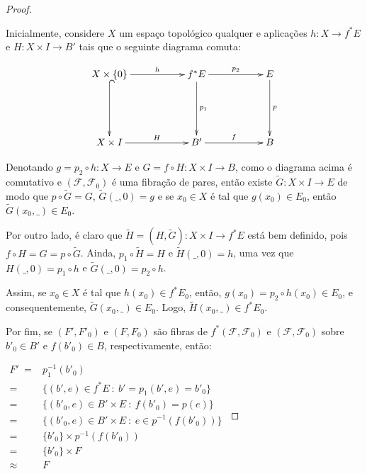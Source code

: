 \documentclass[12pt,oneside]{book} %
\newcommand{\wt}{\widetilde}
\begin{document}
\begin{proof}
	
	\
	
	\par Inicialmente, considere $X$ um espaço topológico qualquer e aplicações $h:X\to f^{*}E$ e $H:X\times I\to B'$ tais que o seguinte diagrama comuta:
	
	$$\xymatrix @C=0.5cm {
		X\times\{ 0 \} \ar[rrr]^-{h} \ar@{^(->}[dd] &&& f^{*}E \ar[rrr]^-{p_{2}} \ar[dd]^-{p_{1}} &&& E \ar[dd]^-{p} \\
		&&& &&& \\
		X\times I \ar[rrr]^-{H} &&& B' \ar[rrr]^-{f} &&& B
	}$$
	
	\par Denotando $g=p_{2}\circ h:X\to E$ e $G=f\circ H:X\times I\to B$, como o diagrama acima é comutativo e $(\mathcal{F},\mathcal{F}_{0})$ é uma fibração de pares, então existe $\wt{G}:X\times I\to E$ de modo que $p\circ\wt{G}=G$, $\wt{G}(\_,0)=g$ e se $x_{0}\in X$ é tal que $g(x_{0})\in E_{0}$, então $\wt{G}(x_{0},\_)\in E_{0}$.
	
	\par Por outro lado, é claro que $\wt{H}=(H,\wt{G}):X\times I\to f^{*}E$ está bem definido, pois $f\circ H=G=p\circ\wt{G}$. Ainda, $p_{1}\circ\wt{H}=H$ e $\wt{H}(\_,0)=h$, uma vez que $H(\_,0)=p_{1}\circ h$ e $\wt{G}(\_,0)=p_{2}\circ h$.
	
	\par Assim, se $x_{0}\in X$ é tal que $h(x_{0})\in f^{*}E_{0}$, então, $g(x_{0})=p_{2}\circ h(x_{0})\in E_{0}$, e consequentemente, $\wt{G}(x_{0},\_)\in E_{0}$. Logo, $\wt{H}(x_{0},\_)\in f^{*}E_{0}$.
	
	\par Por fim, se $(F',F'_{0})$ e $(F,F_{0})$ são fibras de $f^{*}(\mathcal{F},\mathcal{F}_{0})$ e $(\mathcal{F},\mathcal{F}_{0})$ sobre $b'_{0}\in B'$ e $f(b'_{0})\in B$, respectivamente, então: \newline
	
	$\begin{array}{rl}
		F' \ = & p_{1}^{-1}(b'_{0}) \\
		= & \{ (b',e)\in f^{*}E \ : \ b'=p_{1}(b',e)=b'_{0} \} \\
		= & \{ (b'_{0},e)\in B'\times E \ : \ f(b'_{0})=p(e) \} \\
		= & \{ (b'_{0},e)\in B'\times E \ : \ e\in p^{-1}(f(b'_{0})) \} \\
		= & \{ b'_{0} \}\times p^{-1}(f(b'_{0})) \\
		= & \{ b'_{0} \}\times F \\
		\approx & F
	\end{array}$
	

\end{proof}
\end{document}
